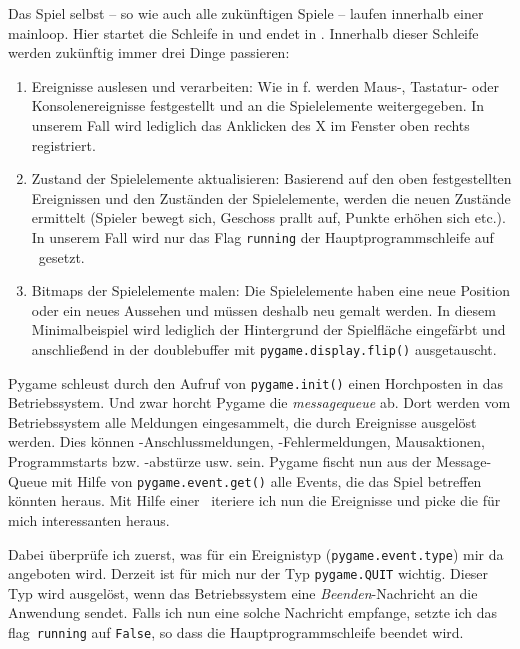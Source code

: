 Das Spiel selbst -- so wie auch alle zukünftigen Spiele -- laufen innerhalb einer \Gls{mainloop}. Hier startet die Schleife in  und endet in . Innerhalb dieser Schleife werden zukünftig immer drei Dinge passieren: 
\begin{enumerate}
	\item Ereignisse auslesen und verarbeiten: Wie in f. werden Maus-, Tastatur- oder Konsolenereignisse festgestellt und an die Spielelemente weitergegeben. In unserem Fall wird lediglich das Anklicken des X im Fenster oben rechts registriert.  
	\item Zustand der Spielelemente aktualisieren: Basierend auf den oben festgestellten Ereignissen und den Zuständen der Spielelemente, werden die neuen Zustände ermittelt (Spieler bewegt sich, Geschoss prallt auf, Punkte erhöhen sich etc.). In unserem Fall wird nur das Flag \texttt{running} der Hauptprogrammschleife auf \false\ gesetzt.
	\item Bitmaps der Spielelemente malen: Die Spielelemente haben eine neue Position oder ein neues Aussehen und müssen deshalb neu gemalt werden. In diesem Minimalbeispiel wird lediglich  der Hintergrund der Spielfläche eingefärbt und anschließend in  der \Gls{doublebuffer} mit \texttt{pygame.display.flip()} ausgetauscht.
\end{enumerate}

Pygame schleust durch den Aufruf von \texttt{py\-game.\-init()} einen Horchposten in das Betriebssystem. Und zwar horcht Pygame die \emph{\Gls{messagequeue}} ab. Dort werden vom Betriebssystem alle Meldungen eingesammelt, die durch Ereignisse ausgelöst werden. Dies können -An\-schluss\-mel\-dungen, -Fehlermeldungen, Mausaktionen, Programmstarts bzw. -abstürze  usw. sein. Pygame fischt nun aus der Message-Queue mit Hilfe von \texttt{pygame.event.get()} alle Events, die das Spiel betreffen könnten heraus. Mit Hilfe einer \forSchleife\ iteriere ich nun die Ereignisse und picke die für mich interessanten heraus. 

Dabei überprüfe ich zuerst, was für ein Ereignistyp (\texttt{pygame.event.type}) mir da angeboten wird. Derzeit ist für mich nur der Typ \texttt{pygame.QUIT} wichtig. Dieser Typ wird ausgelöst, wenn das Betriebssystem eine \emph{Beenden}-Nachricht an die Anwendung sendet. Falls ich nun eine solche Nachricht empfange, setzte ich das \Gls{flag}\ \texttt{running} auf \texttt{False}, so dass die Hauptprogrammschleife beendet wird.

